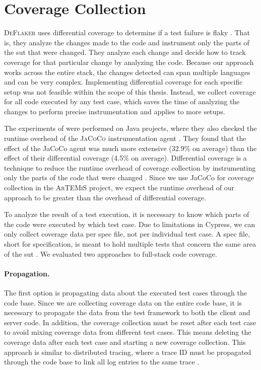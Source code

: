 \section{Coverage Collection}
\textsc{DeFlaker} uses differential coverage to determine if a test failure is flaky \autocite{bell_deflaker_2018}.
That is, they analyze the changes made to the code and instrument only the parts of the \ac{sut} that were changed.
They analyze each change and decide how to track coverage for that particular change by analyzing the code.
Because our approach works across the entire stack, the changes detected can span multiple languages and can be very complex.
Implementing differential coverage for each specific setup was not feasible within the scope of this thesis.
Instead, we collect coverage for all code executed by any test case, which saves the time of analyzing the changes to perform precise instrumentation and applies to more setups.

The experiments of \citeauthor*{bell_deflaker_2018} were performed on Java projects, where they also checked the runtime overhead of the \textsc{JaCoCo} instrumentation agent \autocite{bell_deflaker_2018}.
They found that the effect of the JaCoCo agent was much more extensive (32.9\% on average) than the effect of their differential coverage (4.5\% on average).
Differential coverage is a technique to reduce the runtime overhead of coverage collection by instrumenting only the parts of the code that were changed \autocite{bell_deflaker_2018}.
Since we use JaCoCo for coverage collection in the \textsc{ArTEMiS} project, we expect the runtime overhead of our approach to be greater than the overhead of differential coverage.

To analyze the result of a test execution, it is necessary to know which parts of the code were executed by which test case.
Due to limitations in Cypress, we can only collect coverage data per spec file, not per individual test case.
A spec file, short for specification, is meant to hold multiple tests that concern the same area of the \ac{sut} \autocite{noauthor_writing_nodate}.
We evaluated two approaches to full-stack code coverage.

\paragraph{Propagation.} The first option is propagating data about the executed test cases through the code base.
Since we are collecting coverage data on the entire code base, it is necessary to propagate the data from the test framework to both the client and server code.
In addition, the coverage collection must be reset after each test case to avoid mixing coverage data from different test cases.
This means deleting the coverage data after each test case and starting a new coverage collection.
This approach is similar to distributed tracing, where a trace ID must be propagated through the code base to link all log entries to the same trace \autocite{noauthor_distributed_nodate}.

